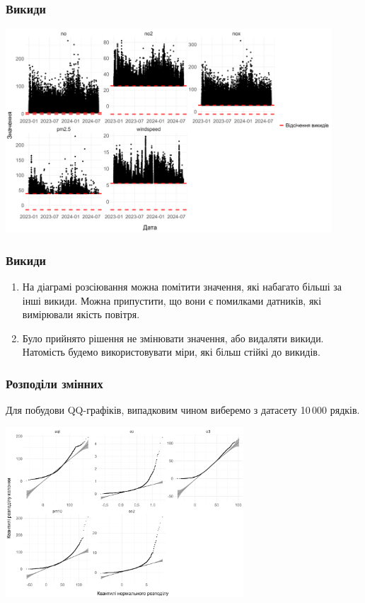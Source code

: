\documentclass{beamer}
\begin{document}
\begin{frame}
  \frametitle{Викиди}

  \begin{center}
    \includegraphics[height=3in]{plots/outliers/scatter-p2.png}
  \end{center}
\end{frame}

\begin{frame}
  \frametitle{Викиди}

  \begin{enumerate}
    \item На діаграмі розсіювання можна помітити значення, які набагато більші за
    інші викиди. Можна припустити, що вони є помилками датників, які вимірювали якість
    повітря.
    \item Було прийнято рішення не змінювати значення, або видаляти викиди.
    Натомість будемо використовувати міри, які більш стійкі до викидів.
  \end{enumerate}
\end{frame}

\begin{frame}
  \frametitle{Розподіли змінних}

  Для побудови QQ-графіків, випадковим чином виберемо з датасету 10\,000 рядків.

  \begin{center}
    \includegraphics[height=2.5in]{plots/qq_tidy/qq-p1.png}
  \end{center}
\end{frame}
\end{document}
